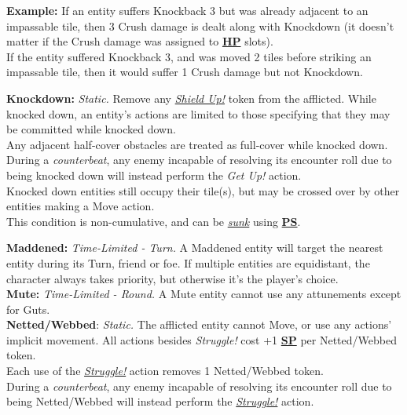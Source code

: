 \documentclass[12pt]{article}
\newcommand{\refto}[1]{\hyperlink{#1}{\textbf{#1}}}
\newcommand{\reftoit}[1]{\hyperlink{#1}{\emph{#1}}}
\begin{document}
\begin{multicols*}{2}
\begin{tcolorbox}
\textbf{Example:} If an entity suffers Knockback 3 but was already adjacent to an impassable tile, then 3 Crush damage is dealt along with Knockdown (it doesn’t matter if the Crush damage was assigned to \refto{HP} slots).\\
If the entity suffered Knockback 3, and was moved 2 tiles before striking an impassable tile, then it would suffer 1 Crush damage but not Knockdown.
\end{tcolorbox}

\textbf{Knockdown:} \emph{Static.} Remove any \reftoit{Shield Up!} token from the afflicted. While knocked down, an entity’s actions are limited to those specifying that they may be committed while knocked down.\\
Any adjacent half-cover obstacles are treated as full-cover while knocked down.\\
During a \emph{counterbeat}, any enemy incapable of resolving its encounter roll due to being knocked down will instead perform the \emph{Get Up!} action.\\
Knocked down entities still occupy their tile(s), but may be crossed over by other entities making a Move action.\\
This condition is non-cumulative, and can be \reftoit{sunk} using \refto{PS}.\\

\pagebreak

\textbf{Maddened:} \emph{Time-Limited - Turn.} A Maddened entity will target the nearest entity during its Turn, friend or foe. If multiple entities are equidistant, the character always takes priority, but otherwise it’s the player’s choice.\\

\textbf{Mute:} \emph{Time-Limited - Round.} A Mute entity cannot use any attunements except for Guts.\\

\textbf{Netted/Webbed}: \emph{Static.} The afflicted entity cannot Move, or use any actions’ implicit movement. All actions besides \emph{Struggle!} cost +1 \refto{SP} per Netted/Webbed token.\\
Each use of the \reftoit{Struggle!} action removes 1 Netted/Webbed token.\\
During a \emph{counterbeat}, any enemy incapable of resolving its encounter roll due to being Netted/Webbed will instead perform the \reftoit{Struggle!} action.\\


\end{multicols*}
\end{document}
